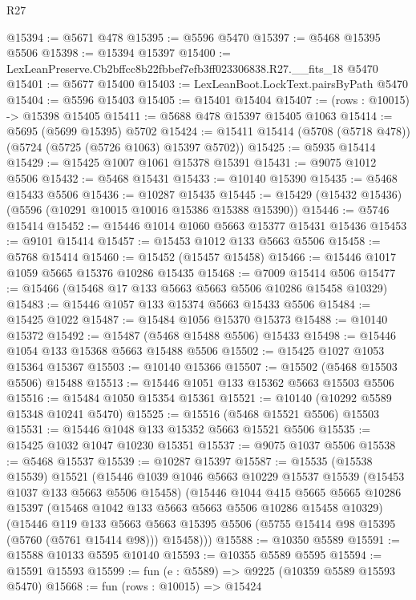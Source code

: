 \begin{lexlean}{R27}
\begin{coremodule}
@15394 := @5671 @478
@15395 := @5596 @5470
@15397 := @5468 @15395 @5506
@15398 := @15394 @15397
@15400 := LexLeanPreserve.Cb2bffcc8b22fbbef7efb3ff023306838.R27.__fits_18 @5470
@15401 := @5677 @15400
@15403 := LexLeanBoot.LockText.pairsByPath @5470
@15404 := @5596 @15403
@15405 := @15401 @15404
@15407 := (rows : @10015) -> @15398 @15405
@15411 := @5688 @478 @15397 @15405 @1063
@15414 := @5695 (@5699 @15395) @5702
@15424 := @15411 @15414 (@5708 (@5718 @478)) (@5724 (@5725 (@5726 @1063) @15397 @5702))
@15425 := @5935 @15414
@15429 := @15425 @1007 @1061 @15378 @15391
@15431 := @9075 @1012 @5506
@15432 := @5468 @15431
@15433 := @10140 @15390
@15435 := @5468 @15433 @5506
@15436 := @10287 @15435
@15445 := @15429 (@15432 @15436) (@5596 (@10291 @10015 @10016 @15386 @15388 @15390))
@15446 := @5746 @15414
@15452 := @15446 @1014 @1060 @5663 @15377 @15431 @15436
@15453 := @9101 @15414
@15457 := @15453 @1012 @133 @5663 @5506
@15458 := @5768 @15414
@15460 := @15452 (@15457 @15458)
@15466 := @15446 @1017 @1059 @5665 @15376 @10286 @15435
@15468 := @7009 @15414 @506
@15477 := @15466 (@15468 @17 @133 @5663 @5663 @5506 @10286 @15458 @10329)
@15483 := @15446 @1057 @133 @15374 @5663 @15433 @5506
@15484 := @15425 @1022
@15487 := @15484 @1056 @15370 @15373
@15488 := @10140 @15372
@15492 := @15487 (@5468 @15488 @5506) @15433
@15498 := @15446 @1054 @133 @15368 @5663 @15488 @5506
@15502 := @15425 @1027 @1053 @15364 @15367
@15503 := @10140 @15366
@15507 := @15502 (@5468 @15503 @5506) @15488
@15513 := @15446 @1051 @133 @15362 @5663 @15503 @5506
@15516 := @15484 @1050 @15354 @15361
@15521 := @10140 (@10292 @5589 @15348 @10241 @5470)
@15525 := @15516 (@5468 @15521 @5506) @15503
@15531 := @15446 @1048 @133 @15352 @5663 @15521 @5506
@15535 := @15425 @1032 @1047 @10230 @15351
@15537 := @9075 @1037 @5506
@15538 := @5468 @15537
@15539 := @10287 @15397
@15587 := @15535
    (@15538 @15539)
    @15521
    (@15446
      @1039
      @1046
      @5663
      @10229
      @15537
      @15539
      (@15453 @1037 @133 @5663 @5506 @15458)
      (@15446
        @1044
        @415
        @5665
        @5665
        @10286
        @15397
        (@15468 @1042 @133 @5663 @5663 @5506 @10286 @15458 @10329)
        (@15446
          @119
          @133
          @5663
          @5663
          @15395
          @5506
          (@5755 @15414 @98 @15395 (@5760 (@5761 @15414 @98)))
          @15458)))
@15588 := @10350 @5589
@15591 := @15588 @10133 @5595 @10140
@15593 := @10355 @5589 @5595
@15594 := @15591 @15593
@15599 := fun (e : @5589) => @9225 (@10359 @5589 @15593 @5470)
@15668 := fun (rows : @10015) =>
  @15424

\end{coremodule}
\end{lexlean}
